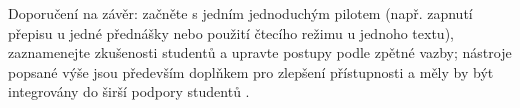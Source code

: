 Doporučení na závěr: začněte s jedním jednoduchým pilotem (např. zapnutí přepisu u jedné přednášky nebo použití čtecího režimu u jednoho textu), zaznamenejte zkušenosti studentů a upravte postupy podle zpětné vazby; nástroje popsané výše jsou především doplňkem pro zlepšení přístupnosti a měly by být integrovány do širší podpory studentů \cite{kb_ai_101_tipu_pdf_04e4a115_page_11_1,kb_ai_101_tipu_pdf_04e4a115_page_7_1}.